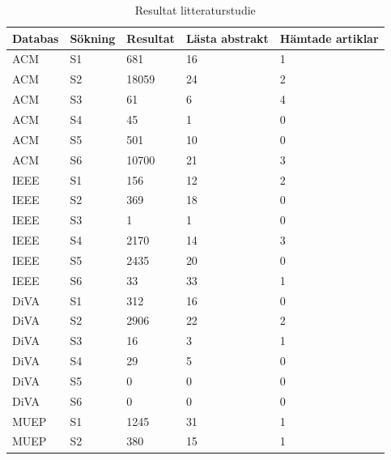 \documentclass[swedish]{maucsthesis}
\begin{document}
\begin{table}[H]
\centering
\caption{Resultat litteraturstudie}
\begin{tabular}{|l|l|l|l|l|}
\hline
Databas & Sökning & Resultat & Lästa abstrakt & Hämtade artiklar \\ \hline
ACM     & S1      & 681      & 16             & 1                \\ \hline
ACM     & S2      & 18059    & 24             & 2                \\ \hline
ACM     & S3      & 61       & 6              & 4                \\ \hline
ACM     & S4      & 45       & 1              & 0                \\ \hline
ACM     & S5      & 501        & 10              & 0                \\ \hline
ACM     & S6      & 10700        & 21              & 3                \\ \hline
IEEE    & S1      & 156      & 12             & 2                \\ \hline
IEEE    & S2      & 369      & 18             & 0                \\ \hline
IEEE    & S3      & 1        & 1              & 0                \\ \hline
IEEE    & S4      & 2170     & 14             & 3                \\ \hline
IEEE    & S5      & 2435     & 20             & 0                \\ \hline
IEEE    & S6      & 33     & 33             & 1                \\ 
\hline
DiVA    & S1      & 312      & 16             & 0                \\ \hline
DiVA    & S2      & 2906     & 22             & 2                \\ \hline
DiVA    & S3      & 16       & 3              & 1                \\ \hline
DiVA    & S4      & 29       & 5              & 0                \\ \hline
DiVA    & S5      & 0        & 0              & 0                \\ \hline
DiVA    & S6      & 0        & 0              & 0                \\ \hline
MUEP    & S1      & 1245     & 31             & 1                \\ \hline
MUEP    & S2      & 380      & 15             & 1                \\ \hline

\end{tabular}
\end{table}
\end{document}
